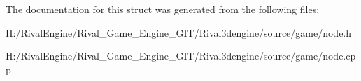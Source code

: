 The documentation for this struct was generated from the following files\+:\begin{DoxyCompactItemize}
\item 
H\+:/\+Rival\+Engine/\+Rival\+\_\+\+Game\+\_\+\+Engine\+\_\+\+G\+I\+T/\+Rival3dengine/source/game/node.\+h\item 
H\+:/\+Rival\+Engine/\+Rival\+\_\+\+Game\+\_\+\+Engine\+\_\+\+G\+I\+T/\+Rival3dengine/source/game/node.\+cpp\end{DoxyCompactItemize}
